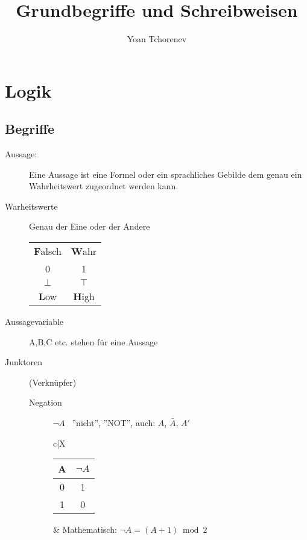 \documentclass[12pt,a4paper]{article}
\title{Grundbegriffe und Schreibweisen}
\author{Yoan Tchorenev}
\begin{document}
\begin{titlepage}
	\maketitle
	\tableofcontents
\end{titlepage}

\section{Logik}
\subsection{Begriffe}
\begin{description}
	\item[Aussage:] Eine Aussage ist eine Formel oder ein sprachliches Gebilde dem genau ein Wahrheitswert zugeordnet werden kann.
	
	\item[Warheitswerte] Genau der Eine oder der Andere \\
		\begin{tabular}{c|c}
			\textbf{F}alsch & \textbf{W}ahr \\
			0 & 1 \\
			$\bot$ & $\top$ \\
			\textbf{L}ow & \textbf{H}igh
		\end{tabular}
	
	\item[Aussagevariable] A,B,C etc. stehen für eine Aussage
	
	\item[Junktoren] (Verknüpfer)
		\begin{description}
			\item[Negation] $\neg A$ \, ''nicht'', ''NOT'', auch: $A$, $\bar{A}$, $A'$ \\
				\begin{tabularx}{\linewidth}{c|X}
					\begin{tabular}[t]{c|c}
						A & $\neg A$  \\ \hline
						0 & 1 \\
						1 & 0
					\end{tabular} &
					Mathematisch: $\neg A = (A + 1) \bmod 2$ \\ \hline
				\end{tabularx}
			

\end{description}
\end{description}
\end{document}

